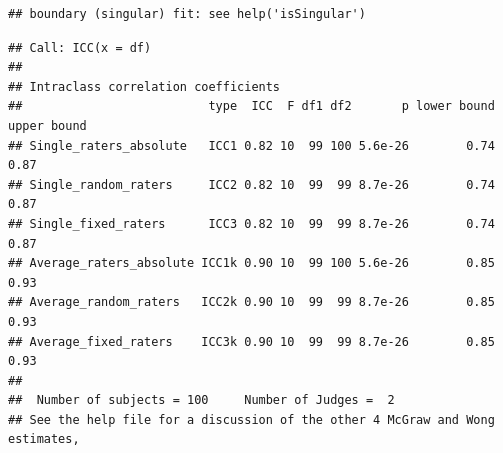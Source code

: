 \documentclass[
]{book}
\newenvironment{Shaded}{\begin{snugshade}}{\end{snugshade}}
\newcommand{\AttributeTok}[1]{\textcolor[rgb]{0.13,0.29,0.53}{#1}}
\newcommand{\CommentTok}[1]{\textcolor[rgb]{0.56,0.35,0.01}{\textit{#1}}}
\newcommand{\DecValTok}[1]{\textcolor[rgb]{0.00,0.00,0.81}{#1}}
\newcommand{\FunctionTok}[1]{\textcolor[rgb]{0.13,0.29,0.53}{\textbf{#1}}}
\newcommand{\NormalTok}[1]{#1}
\newcommand{\OtherTok}[1]{\textcolor[rgb]{0.56,0.35,0.01}{#1}}
\newcommand{\SpecialCharTok}[1]{\textcolor[rgb]{0.81,0.36,0.00}{\textbf{#1}}}
\newcommand{\StringTok}[1]{\textcolor[rgb]{0.31,0.60,0.02}{#1}}
\begin{document}
\begin{verbatim}
## boundary (singular) fit: see help('isSingular')
\end{verbatim}

\begin{verbatim}
## Call: ICC(x = df)
## 
## Intraclass correlation coefficients 
##                          type  ICC  F df1 df2       p lower bound upper bound
## Single_raters_absolute   ICC1 0.82 10  99 100 5.6e-26        0.74        0.87
## Single_random_raters     ICC2 0.82 10  99  99 8.7e-26        0.74        0.87
## Single_fixed_raters      ICC3 0.82 10  99  99 8.7e-26        0.74        0.87
## Average_raters_absolute ICC1k 0.90 10  99 100 5.6e-26        0.85        0.93
## Average_random_raters   ICC2k 0.90 10  99  99 8.7e-26        0.85        0.93
## Average_fixed_raters    ICC3k 0.90 10  99  99 8.7e-26        0.85        0.93
## 
##  Number of subjects = 100     Number of Judges =  2
## See the help file for a discussion of the other 4 McGraw and Wong estimates,
\end{verbatim}

\begin{Shaded}
\end{Shaded}
\end{document}
